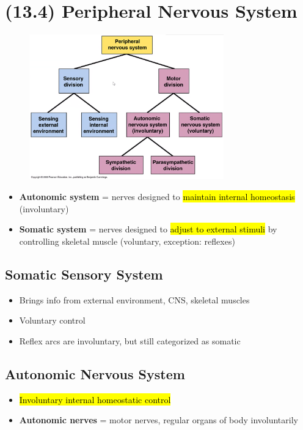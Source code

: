 \documentclass[a4paper,12pt]{article}
\begin{document}
\section{(13.4) Peripheral Nervous System}
\begin{figure}[H]
    \centering
    \includegraphics[width=0.75\textwidth]{peripheral}
\end{figure}
\begin{itemize}
    \item{\textbf{Autonomic system} = nerves designed to \hl{maintain internal homeostasis} (involuntary)}
    \item{\textbf{Somatic system} = nerves designed to \hl{adjust to external stimuli} by controlling skeletal muscle (voluntary, exception: reflexes)}
\end{itemize}

\subsection{Somatic Sensory System}
\begin{itemize}
    \item{Brings info from external environment, CNS, skeletal muscles}
    \item{Voluntary control}
    \item{Reflex arcs are involuntary, but still categorized as somatic}
\end{itemize}

\subsection{Autonomic Nervous System}
\begin{itemize}
    \item{\hl{Involuntary internal homeostatic control}}
    \item{\textbf{Autonomic nerves} = motor nerves, regular organs of body involuntarily}
\end{itemize}
\end{document}
